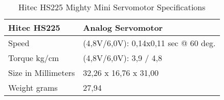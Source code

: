 \begin{table}[H]
	\centering
	\begin{tabular}{|p{4cm}|p{7cm}|}
		\hline%
		Hitec HS225                & Analog Servomotor   \\
		\hline%
		Speed                    &  (4,8V/6,0V): 0,14x0,11 sec @ 60 deg.  	\\
		\hline%
		Torque kg/cm                    &  (4,8V/6,0V): 3,9 / 4,8  	\\
		\hline%
		Size in Millimeters 							 &  32,26 x 16,76 x 31,00    \\
		\hline%
		Weight grams      &  27,94    \\
		\hline%
	\end{tabular}
	\caption{Hitec HS225 Mighty Mini Servomotor Specifications}
	\label{HitecHS225Servomotor}
\end{table}
